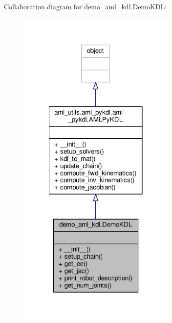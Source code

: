 Collaboration diagram for demo\-\_\-aml\-\_\-kdl.\-Demo\-K\-D\-L\-:
\nopagebreak
\begin{figure}[H]
\begin{center}
\leavevmode
\includegraphics[width=222pt]{classdemo__aml__kdl_1_1_demo_k_d_l__coll__graph}
\end{center}
\end{figure}
